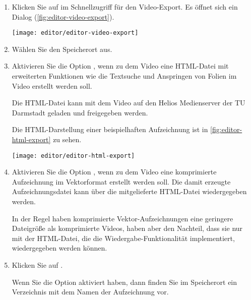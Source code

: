 \label{section:video-export}
\begin{enumerate}
	\item Klicken Sie auf  im Schnellzugriff für den Video-Export. Es öffnet sich ein Dialog (\autoref{fig:editor-video-export}).
	
	\begin{minipage}{0.9\textwidth}
		\centering
		\captionsetup{type=figure}
		\texttt{[image: editor/editor-video-export]}
		\label{fig:editor-video-export}
	\end{minipage}

	\item Wählen Sie den Speicherort aus.
	\item Aktivieren Sie die Option , wenn zu dem Video eine HTML-Datei mit erweiterten Funktionen wie die Textsuche und Anspringen von Folien im Video erstellt werden soll.
	
	\begin{note}
		Die HTML-Datei kann mit dem Video auf den Helios Medienserver der TU Darmstadt geladen und freigegeben werden.
	\end{note}

	Die HTML-Darstellung einer beispielhaften Aufzeichnung ist in \autoref{fig:editor-html-export} zu sehen.

	\begin{minipage}{0.9\textwidth}
		\centering
		\captionsetup{type=figure}
		\texttt{[image: editor/editor-html-export]}
		\label{fig:editor-html-export}
	\end{minipage}

	\item Aktivieren Sie die Option , wenn zu dem Video eine komprimierte Aufzeichnung im Vektorformat erstellt werden soll. Die damit erzeugte Aufzeichnungsdatei kann über die mitgelieferte HTML-Datei wiedergegeben werden.

	\begin{note}
		In der Regel haben komprimierte Vektor-Aufzeichnungen eine geringere Dateigröße als komprimierte Videos, haben aber den Nachteil, dass sie nur mit der HTML-Datei, die die Wiedergabe-Funktionalität implementiert, wiedergegeben werden können.
	\end{note}

	\item Klicken Sie auf .
	\begin{info}
		Wenn Sie die Option  aktiviert haben, dann finden Sie im Speicherort ein Verzeichnis mit dem Namen der Aufzeichnung vor.
	\end{info}
\end{enumerate}

